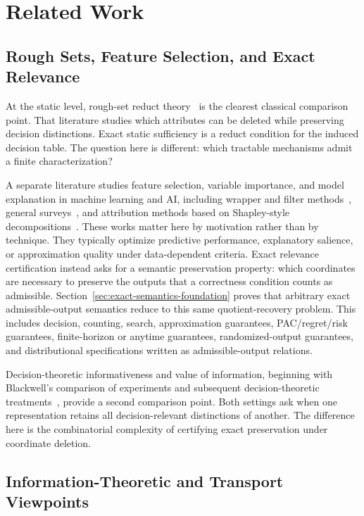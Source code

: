 \section{Related Work}\label{sec:related}

\subsection*{Rough Sets, Feature Selection, and Exact Relevance}

At the static level, rough-set reduct theory~\cite{pawlak1982rough,slowinski1995decision} is the clearest classical comparison point. That literature studies which attributes can be deleted while preserving decision distinctions. Exact static sufficiency is a reduct condition for the induced decision table. The question here is different: which tractable mechanisms admit a finite characterization?

A separate literature studies feature selection, variable importance, and model explanation in machine learning and AI, including wrapper and filter methods~\cite{kohavi1997wrappers}, general surveys~\cite{guyon2003introduction}, and attribution methods based on Shapley-style decompositions~\cite{lundberg2017unified}. These works matter here by motivation rather than by technique. They typically optimize predictive performance, explanatory salience, or approximation quality under data-dependent criteria. Exact relevance certification instead asks for a semantic preservation property: which coordinates are necessary to preserve the outputs that a correctness condition counts as admissible. Section~\ref{sec:exact-semantics-foundation} proves that arbitrary exact admissible-output semantics reduce to this same quotient-recovery problem. This includes decision, counting, search, approximation guarantees, PAC/regret/risk guarantees, finite-horizon or anytime guarantees, randomized-output guarantees, and distributional specifications written as admissible-output relations.

Decision-theoretic informativeness and value of information, beginning with Blackwell's comparison of experiments and subsequent decision-theoretic treatments~\cite{blackwell1953equivalent,savage1954foundations,howard1966information}, provide a second comparison point. Both settings ask when one representation retains all decision-relevant distinctions of another. The difference here is the combinatorial complexity of certifying exact preservation under coordinate deletion.

\subsection*{Information-Theoretic and Transport Viewpoints}

